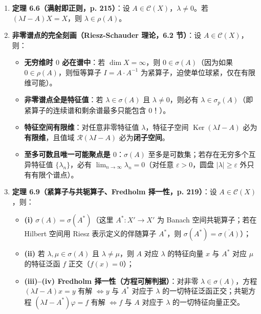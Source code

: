 \documentclass[11pt,a4paper]{article}
\providecommand{\tightlist}{\setlength{\itemsep}{1.8pt}\setlength{\parskip}{0pt}}
\begin{document}
\begin{enumerate}
\def\labelenumi{\arabic{enumi}.}
\tightlist
\item
  \textbf{定理 6.6（满射即正则，p. 215）}：设 \(A \in \mathcal{C}(X)\)，\(\lambda \neq 0\)。若 \((\lambda I - A)X = X\)，则 \(\lambda \in \rho(A)\)。
\item
  \textbf{非零谱点的完全刻画（Riesz-Schauder 理论，6.2 节）}：设 \(A \in \mathcal{C}(X)\)，则：

  \begin{itemize}
  \tightlist
  \item
    \textbf{无穷维时 \(0\) 必在谱中}：若 \(\dim X = \infty\)，则 \(0 \in \sigma(A)\)（因为如果 \(0 \in \rho(A)\)，则恒等算子 \(I = A \cdot A^{-1}\) 为紧算子，迫使单位球紧，仅在有限维可能）。
  \item
    \textbf{非零谱点全是特征值}：若 \(\lambda \in \sigma(A)\) 且 \(\lambda \neq 0\)，则必有 \(\lambda \in \sigma_p(A)\)（即紧算子的连续谱和剩余谱最多只能包含 \(0\)！）。
  \item
    \textbf{特征空间有限维}：对任意非零特征值 \(\lambda\)，特征子空间 \(\operatorname{Ker}(\lambda I - A)\) 必为\textbf{有限维}，且值域 \(\mathcal{R}(\lambda I - A)\) 必为\textbf{闭子空间}。
  \item
    \textbf{至多可数且唯一可能聚点是 \(0\)}：\(\sigma(A)\) 至多是可数集；若存在无穷多个互异特征值 \(\{\lambda_n\}\)，必有 \(\lim_{n\to\infty} \lambda_n = 0\)（对任意 \(\varepsilon > 0\)，圆盘 \(|\lambda| \ge \varepsilon\) 外只有有限个谱点）。
  \end{itemize}
\item
  \textbf{定理 6.9（紧算子与共轭算子、Fredholm 择一性，p. 219）}：设 \(A \in \mathcal{C}(X)\)，则：

  \begin{itemize}
  \tightlist
  \item
    \textbf{(i)} \(\sigma(A) = \sigma(A^*)\)（这里 \(A^* : X' \to X'\) 为 Banach 空间共轭算子；若在 Hilbert 空间用 Riesz 表示定义的伴随算子 \(A^*\)，则 \(\sigma(A^*) = \overline{\sigma(A)}\)）；
  \item
    \textbf{(ii)} 若 \(\lambda, \mu \in \sigma(A)\) 且 \(\lambda \neq \mu\)，则 \(A\) 对应 \(\lambda\) 的特征向量 \(x\) 与 \(A^*\) 对应 \(\mu\) 的特征泛函 \(f\) 正交（\(f(x) = 0\)）；
  \item
    \textbf{(iii)--(iv) Fredholm 择一性（方程可解判据）}：对非零 \(\lambda \in \sigma(A)\)，方程 \((\lambda I - A)x = y\) 有解 \(\iff y\) 与 \(A^*\) 对应于 \(\lambda\) 的一切特征泛函正交；共轭方程 \((\lambda I - A^*)\varphi = f\) 有解 \(\iff f\) 与 \(A\) 对应于 \(\lambda\) 的一切特征向量正交。
  \end{itemize}
\end{enumerate}
\end{document}
